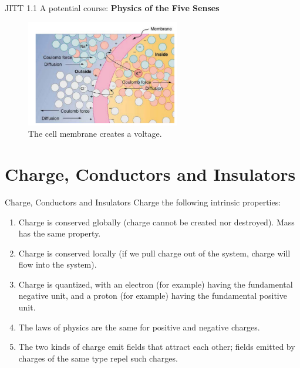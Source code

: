 \documentclass{beamer}
\begin{document}
\begin{frame}{JITT 1.1}
A potential course: \textbf{Physics of the Five Senses}
\begin{figure}
\centering
\includegraphics[width=0.6\textwidth]{figures/membrane.png}
\caption{\label{fig:membrane} The cell membrane creates a voltage.}
\end{figure}
\end{frame}

\section{Charge, Conductors and Insulators}

\begin{frame}{Charge, Conductors and Insulators}
\small
Charge the following intrinsic properties: \\ \vspace{0.25cm}
\begin{enumerate}
\item Charge is conserved globally (charge cannot be created nor destroyed).  Mass has the same property.
\item Charge is conserved locally (if we pull charge out of the system, charge will flow into the system).
\item Charge is quantized, with an electron (for example) having the fundamental negative unit, and a proton (for example) having the fundamental positive unit.
\item The laws of physics are the same for positive and negative charges.
\item The two kinds of charge emit fields that attract each other; fields emitted by charges of the same type repel such charges.
\end{enumerate}
\end{frame}
\end{document}
